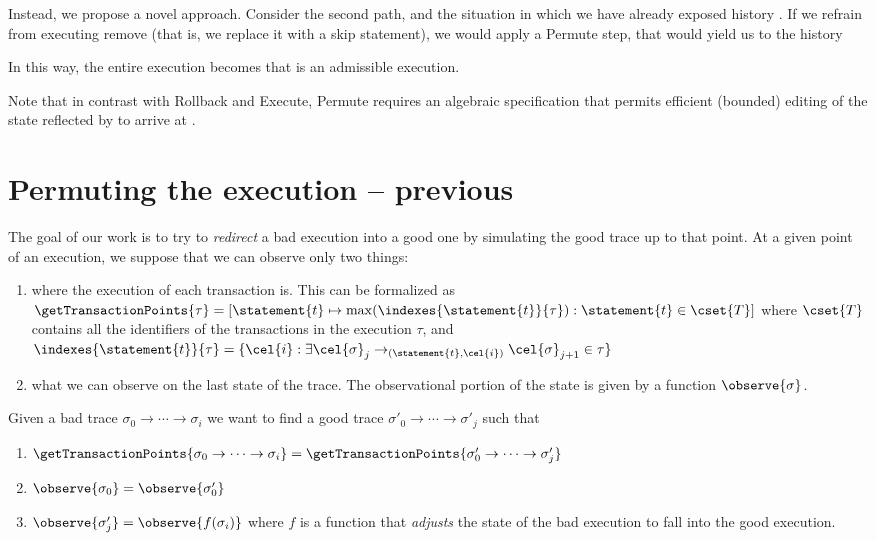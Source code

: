 Instead, we propose a novel approach.
Consider the second path, and the situation in which we have already exposed history .
If we refrain from executing remove (that is, we replace it with a skip statement), we would apply a Permute step, that would yield us to the history	

In this way, the entire execution becomes  that is an admissible execution.

Note that in contrast with Rollback and Execute, Permute requires an algebraic specification that permits efficient (bounded) editing of the state reflected by  to arrive at .




\section{Permuting the execution -- previous}
The goal of our work is to try to \emph{redirect} a bad execution into a good one by simulating the good trace up to that point. At a given point of an execution, we suppose that we can observe only two things:
\begin{enumerate}
\item where the execution of each transaction is. This can be formalized as $\getTransactionPoints{\tau} = [\statement{t} \mapsto \max(\indexes{\statement{t}}{\tau}) : \statement{t} \in \cset{T}]$
where $\cset{T}$ contains all the identifiers of the transactions in the execution $\tau$, and $\indexes{\statement{t}}{\tau}=\{\cel{i} : \exists \cel{\sigma}_j \to_{(\statement{t}, \cel{i})} \cel{\sigma}_{j+1} \in \tau\}$
\item what we can observe on the last state of the trace. The observational portion of the state is given by a function $\observe{\sigma}$.
\end{enumerate}

Given a bad trace $\sigma_0 \to \cdots \to \sigma_i$ we want to find a good trace $\sigma'_0 \to \cdots \to \sigma'_j$ such that
\begin{enumerate}
\item $\getTransactionPoints{\sigma_0 \to \cdots \to \sigma_i} = \getTransactionPoints{\sigma'_0 \to \cdots \to \sigma'_j}$
\item $\observe{\sigma_0}=\observe{\sigma'_0}$
\item $\observe{\sigma'_j} = \observe{f(\sigma_i)}$ where $f$ is a function that \emph{adjusts} the state of the bad execution to fall into the good execution.
\end{enumerate} 

